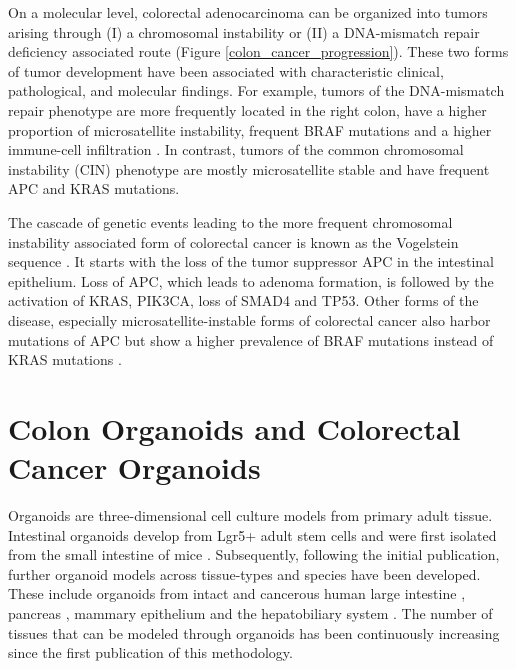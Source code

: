 \begin{flushleft}
On a molecular level, colorectal adenocarcinoma can be organized into tumors arising through (I) a chromosomal instability or (II) a DNA-mismatch repair deficiency associated route \cite{Markowitz2009} (Figure \ref{colon_cancer_progression}). These two forms of tumor development have been associated with characteristic clinical, pathological, and molecular findings. For example, tumors of the DNA-mismatch repair phenotype are more frequently located in the right colon, have a higher proportion of microsatellite instability, frequent BRAF mutations and a higher immune-cell infiltration \cite{Markowitz2009}. In contrast, tumors of the common chromosomal instability (CIN) phenotype are mostly microsatellite stable and have frequent APC and KRAS mutations. \par 

The cascade of genetic events leading to the more frequent chromosomal instability associated form of colorectal cancer is known as the Vogelstein sequence \cite{Cho1992}. It starts with the loss of the tumor suppressor APC in the intestinal epithelium. Loss of APC, which leads to adenoma formation, is followed by the activation of KRAS, PIK3CA, loss of SMAD4 and TP53. Other forms of the disease, especially microsatellite-instable forms of colorectal cancer also harbor mutations of APC but show a higher prevalence of BRAF mutations instead of KRAS mutations \cite{Guinney2015TheCancer.}. \par 



\section{Colon Organoids and Colorectal Cancer Organoids}

Organoids are three-dimensional cell culture models from primary adult tissue. Intestinal organoids develop from Lgr5+ adult stem cells and were first isolated from the small intestine of mice \cite{Sato2011}. Subsequently, following the initial publication, further organoid models across tissue-types and species have been developed. These include organoids from intact and cancerous human large intestine \cite{Sato2011}, pancreas \cite{Sachs2017}, mammary epithelium \cite{Zhang2016EstablishingCells, Sachs2017AHeterogeneity} and the hepatobiliary system \cite{Huch2013NIHAccess, Broutier2016CultureManipulation.}. The number of tissues that can be modeled through organoids has been continuously increasing since the first publication of this methodology. \par


\end{flushleft}
